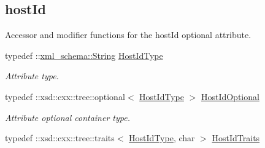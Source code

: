 \subsection*{hostId}
\label{_amgrpb0287af91905d3e00c68a79567174436}
Accessor and modifier functions for the hostId optional attribute. \begin{DoxyCompactItemize}
\item 
\hypertarget{classopenstack_1_1xml_1_1Server_a61b8af2381b0e56443bcaf2b29d55cee}{
typedef ::\hyperlink{namespacexml__schema_af6757b5701ccc893f3b551bd70e0c94d}{xml\_\-schema::String} \hyperlink{classopenstack_1_1xml_1_1Server_a61b8af2381b0e56443bcaf2b29d55cee}{HostIdType}}
\label{classopenstack_1_1xml_1_1Server_a61b8af2381b0e56443bcaf2b29d55cee}

\begin{DoxyCompactList}\small\item\em Attribute type. \item\end{DoxyCompactList}\item 
\hypertarget{classopenstack_1_1xml_1_1Server_a036382a7e80c404d34a32cba3b71d494}{
typedef ::xsd::cxx::tree::optional$<$ \hyperlink{classopenstack_1_1xml_1_1Server_a61b8af2381b0e56443bcaf2b29d55cee}{HostIdType} $>$ \hyperlink{classopenstack_1_1xml_1_1Server_a036382a7e80c404d34a32cba3b71d494}{HostIdOptional}}
\label{classopenstack_1_1xml_1_1Server_a036382a7e80c404d34a32cba3b71d494}

\begin{DoxyCompactList}\small\item\em Attribute optional container type. \item\end{DoxyCompactList}\item 
\hypertarget{classopenstack_1_1xml_1_1Server_aafbce48b6e18c579fc4a18cf7251be5c}{
typedef ::xsd::cxx::tree::traits$<$ \hyperlink{classopenstack_1_1xml_1_1Server_a61b8af2381b0e56443bcaf2b29d55cee}{HostIdType}, char $>$ \hyperlink{classopenstack_1_1xml_1_1Server_aafbce48b6e18c579fc4a18cf7251be5c}{HostIdTraits}}
\label{classopenstack_1_1xml_1_1Server_aafbce48b6e18c579fc4a18cf7251be5c}


\end{DoxyCompactItemize}

